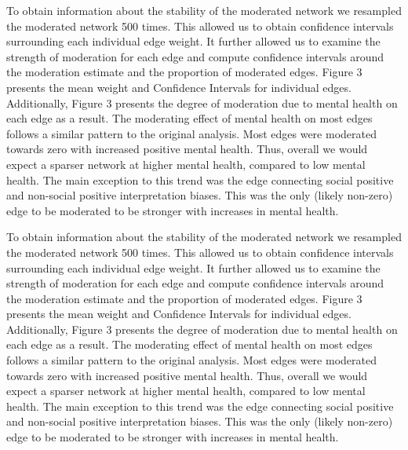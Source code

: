 \documentclass[man,floatsintext]{apa6}
\begin{document}
To obtain information about the stability of the moderated network we resampled the moderated network 500 times. This allowed us to obtain confidence intervals surrounding each individual edge weight. It further allowed us to examine the strength of moderation for each edge and compute confidence intervals around the moderation estimate and the proportion of moderated edges. Figure 3 presents the mean weight and Confidence Intervals for individual edges. Additionally, Figure 3 presents the degree of moderation due to mental health on each edge as a result. The moderating effect of mental health on most edges follows a similar pattern to the original analysis. Most edges were moderated towards zero with increased positive mental health. Thus, overall we would expect a sparser network at higher mental health, compared to low mental health. The main exception to this trend was the edge connecting social positive and non-social positive interpretation biases. This was the only (likely non-zero) edge to be moderated to be stronger with increases in mental health.

To obtain information about the stability of the moderated network we resampled the moderated network 500 times. This allowed us to obtain confidence intervals surrounding each individual edge weight. It further allowed us to examine the strength of moderation for each edge and compute confidence intervals around the moderation estimate and the proportion of moderated edges. Figure 3 presents the mean weight and Confidence Intervals for individual edges. Additionally, Figure 3 presents the degree of moderation due to mental health on each edge as a result. The moderating effect of mental health on most edges follows a similar pattern to the original analysis. Most edges were moderated towards zero with increased positive mental health. Thus, overall we would expect a sparser network at higher mental health, compared to low mental health. The main exception to this trend was the edge connecting social positive and non-social positive interpretation biases. This was the only (likely non-zero) edge to be moderated to be stronger with increases in mental health.
\end{document}
